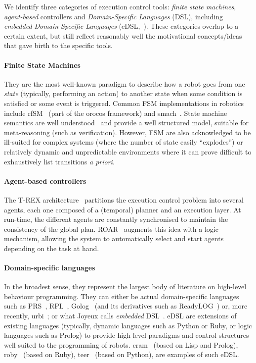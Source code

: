 \documentclass[a4paper, 10pt, conference]{ieeeconf}      %
\begin{document}
We identify three categories of execution control tools: \emph{finite state
machines}, \emph{agent-based} controllers and
\emph{Domain-Specific Languages} (DSL), including \emph{embedded Domain-Specific
Languages} (eDSL,~\cite{joyeux2011robot}). These categories overlap to a certain
extent, but still reflect reasonably well the motivational concepts/ideas that
gave birth to the specific tools.

\paragraph{Finite State Machines} They are the most well-known paradigm to
describe how a robot goes from one \emph{state} (typically, performing an
action) to another state when some condition is satisfied or some event is
triggered. Common FSM implementations in robotics include {\sc
rfSM}~\cite{klotzbucher2010orocos} (part of the {\sc orocos} framework) and
{\sc smach}~\cite{bohren2010smach}. State machine semantics are well
understood~\cite{harel1996statemate} and provide a well structured model,
suitable for meta-reasoning (such as verification). However, FSM are also
acknowledged to be ill-suited for complex systems (where the number of state
easily ``explodes'') or relatively dynamic and unpredictable environments where
it can prove difficult to exhaustively list transitions \textit{a priori}.


\paragraph{Agent-based controllers}

The T-REX architecture~\cite{mcgann2007trex} partitions the execution control
problem into several agents, each one composed of a (temporal) planner and an
execution layer. At run-time, the different agents are constantly synchronised
to maintain the consistency of the global plan. ROAR~\cite{degroote2011roar}
augments this idea with a logic mechanism, allowing the system to automatically
select and start agents depending on the task at hand.

\paragraph{Domain-specific languages}

In the broadest sense, they represent the largest body of literature on
high-level behaviour programming. They can either be actual domain-specific
languages such as PRS~\cite{ingrand1996prs}, RPL~\cite{mcdermott1993reactive},
Golog~\cite{levesque1997golog} (and its derivatives such as {\sc
ReadyLOG}~\cite{ferrein2007robot}) or, more recently, {\sc
urbi}~\cite{baillie2005urbi}; or what Joyeux calls \emph{embedded}
DSL~\cite{joyeux2011robot}. eDSL are extensions of existing languages (typically, dynamic
languages such as Python or Ruby, or logic languages such as Prolog) to provide
high-level paradigms and control structures well suited to the programming of
robots. {\sc cram}~\cite{beetz2010cram} (based on Lisp and Prolog), {\sc
roby}~\cite{joyeux2009plan} (based on Ruby), {\sc teer}~\cite{magnenat2012teer}
(based on Python), are examples of such eDSL.
\end{document}
